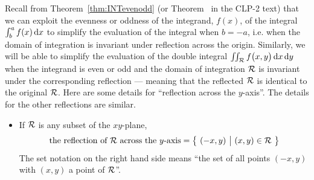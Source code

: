 Recall from  Theorem~\ref{thm:INTevenodd} (or Theorem~ in the CLP-2 text) that we can exploit the evenness or oddness of the integrand, $f(x)$, 
of the integral $\int_b^a f(x)\,\mathrm{d}x$ to simplify the evaluation of 
the integral  when $b=-a$, i.e. when the domain of integration is 
invariant under reflection across the origin. Similarly, we will be able to 
simplify the evaluation of the double integral 
$\iint_{\mathcal{R}} f\big(x,y\big)\,\mathrm{d}x\,\mathrm{d}y$ when the integrand is even or odd and the domain of integration $\mathcal{R}$ is invariant under the corresponding reflection --- meaning that the reflected $\mathcal{R}$ is identical to the original $\mathcal{R}$. Here are some details for ``reflection across the $y$-axis''. The details for the other reflections are similar.
\begin{itemize}
\item
If $\mathcal{R}$ is any subset of the $xy$-plane, 
\begin{equation*}
\text{the reflection of $\mathcal{R}$ across the $y$-axis} =\big\{ \ (-x,y)\ \big|\ (x,y)\in\mathcal{R}\ \big\} 
\end{equation*}
The set notation on the right hand side means ``the set of all points $(-x,y)$
with $(x,y)$ a point of $\mathcal{R}$''.


\end{itemize}
